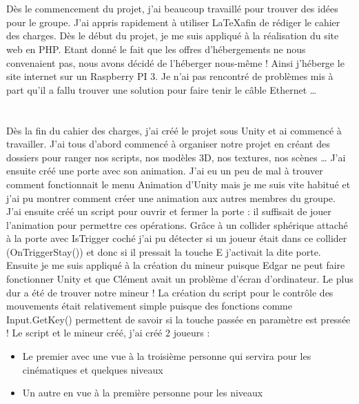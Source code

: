 \documentclass[titlepage, 13px, a4paper]{article}
\begin{document}
\paragraph{} \hspace{0pt} \\
Dès le commencement du projet, j’ai beaucoup travaillé pour trouver des idées pour le groupe.
J’ai appris rapidement à utiliser \LaTeX afin de rédiger le cahier des charges.
Dès le début du projet, je me suis appliqué à la réalisation du site web en PHP. 
Etant donné le fait que les offres d’hébergements ne nous convenaient pas, 
nous avons décidé de l’héberger nous-même ! Ainsi j’héberge le site internet sur un Raspberry PI 3. 
Je n’ai pas rencontré de problèmes mis à part qu’il a fallu trouver une solution pour faire tenir le câble Ethernet …

\paragraph{} \hspace{0pt} \\
Dès la fin du cahier des charges, j’ai créé le projet sous Unity et ai commencé à travailler.
J’ai tous d’abord commencé à organiser notre projet en créant des dossiers pour ranger nos scripts, 
nos modèles 3D, nos textures, nos scènes …
J’ai ensuite créé une porte avec son animation. J’ai eu un peu de mal à trouver comment fonctionnait 
le menu Animation d’Unity mais je me suis vite habitué et j’ai pu montrer comment créer une animation 
aux autres membres du groupe. J’ai ensuite créé un script pour ouvrir et fermer la porte : 
il suffisait de jouer l’animation pour permettre ces opérations.
Grâce à un collider sphérique attaché à la porte avec IsTrigger coché j’ai pu détecter 
si un joueur était dans ce collider (OnTriggerStay()) et donc si il pressait la touche E j’activait la dite porte.
Ensuite je me suis appliqué à la création du mineur puisque Edgar ne peut faire fonctionner Unity 
et que Clément avait un problème d’écran d’ordinateur. Le plus dur a été de trouver notre mineur !
La création du script pour le contrôle des mouvements était relativement simple puisque des fonctions 
comme Input.GetKey() permettent de savoir si la touche passée en paramètre est pressée !
Le script et le mineur créé, j’ai créé 2 joueurs :
{\begin{itemize}
	\item Le premier avec une vue à la troisième personne qui servira pour les cinématiques et quelques niveaux
	\item Un autre en vue à la première personne pour les niveaux  
\end{itemize}}
\end{document}
